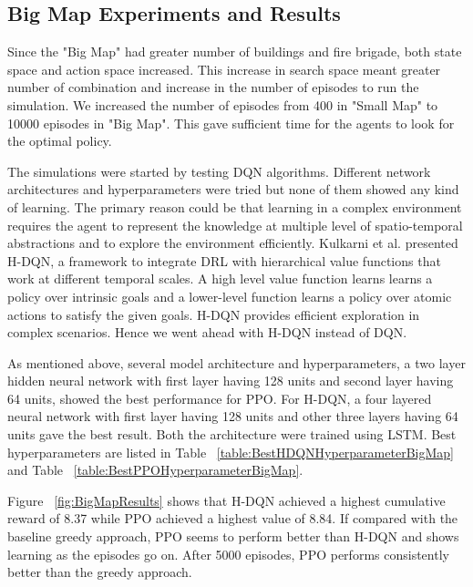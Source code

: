\documentclass[12pt]{report}
\begin{document}
\subsection{Big Map Experiments and Results}

Since the "Big Map" had greater number of buildings and fire brigade, both state space and action space increased. This increase in search space meant greater number of combination and increase in the number of episodes to run the simulation. We increased the number of episodes from 400 in "Small Map" to 10000 episodes in "Big Map". This gave sufficient time for the agents to look for the optimal policy. 

The simulations were started by testing DQN algorithms. Different network architectures and hyperparameters were tried but none of them showed any kind of learning. The primary reason could be that learning in a complex environment requires the agent to represent the knowledge at multiple level of spatio-temporal abstractions and to explore the environment efficiently. Kulkarni et al. \cite{Kulkarni} presented H-DQN, a framework to integrate DRL with hierarchical value functions that work at different temporal scales. A high level value function learns learns a policy over intrinsic goals and a lower-level function learns a policy over atomic actions to satisfy the given goals. H-DQN provides efficient exploration in complex scenarios. Hence we went ahead with H-DQN instead of DQN. 

As mentioned above, several model architecture and hyperparameters, a two layer hidden neural network with first layer having 128 units and second layer having 64 units, showed the best performance for PPO. For H-DQN, a four layered neural network with first layer having 128 units and other three layers having 64 units gave the best result. Both the architecture were trained using LSTM. Best hyperparameters are listed in Table ~\ref{table:BestHDQNHyperparameterBigMap} and Table ~\ref{table:BestPPOHyperparameterBigMap}. 

Figure ~\ref{fig:BigMapResults} shows that H-DQN achieved a highest cumulative reward of 8.37 while PPO achieved a highest value of 8.84. If compared with the baseline greedy approach, PPO seems to perform better than H-DQN and shows learning as the episodes go on. After 5000 episodes, PPO performs consistently better than the greedy approach. 
\end{document}
